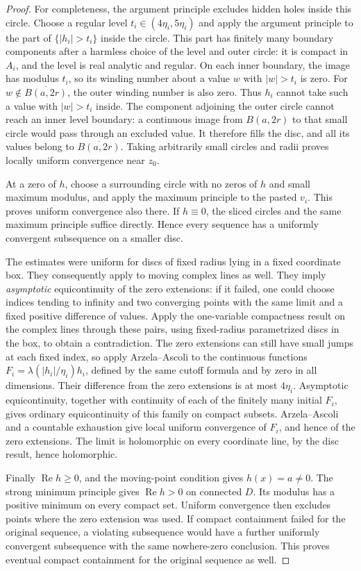 \begin{proof}
For completeness, the argument principle excludes hidden holes
inside this circle. Choose a regular level
\(t_i\in(4\eta_i,5\eta_i)\) and apply the argument principle
to the part of \(\{|h_i|>t_i\}\) inside the circle. This part
has finitely many boundary components after a harmless choice
of the level and outer circle: it is compact in \(A_i\), and
the level is real analytic and regular. On each inner boundary,
the image has modulus \(t_i\), so its winding number about a
value \(w\) with \(|w|>t_i\) is zero. For
\(w\notin\overline{B(a,2r)}\), the outer winding number is
also zero. Thus \(h_i\) cannot take such a value with
\(|w|>t_i\) inside. The component adjoining the outer circle
cannot reach an inner level boundary: a continuous image from
\(B(a,2r)\) to that small circle would pass through an excluded
value. It therefore fills the disc, and all its values belong
to \(\overline{B(a,2r)}\). Taking arbitrarily small circles
and radii proves locally uniform convergence near \(z_0\).

At a zero of \(h\), choose a surrounding circle with no zeros
of \(h\) and small maximum modulus, and apply the maximum
principle to the pasted \(v_i\). This proves uniform convergence
also there. If \(h\equiv0\), the sliced circles and the same
maximum principle suffice directly. Hence every sequence has
a uniformly convergent subsequence on a smaller disc.

The estimates were uniform for discs of fixed radius lying in
a fixed coordinate box. They consequently apply to moving
complex lines as well. They imply \emph{asymptotic}
equicontinuity of the zero extensions: if it failed, one could
choose indices tending to infinity and two converging points
with the same limit and a fixed positive difference of values. Apply the
one-variable compactness result on the complex lines through
these pairs, using fixed-radius parametrized discs in the box,
to obtain a contradiction. The zero extensions can still have
small jumps at each fixed index, so apply Arzela--Ascoli to the
continuous functions \(F_i=\lambda(|h_i|/\eta_i)h_i\), defined
by the same cutoff formula and by zero in all dimensions.
Their difference from the zero extensions is at most
\(4\eta_i\). Asymptotic equicontinuity, together with continuity
of each of the finitely many initial \(F_i\), gives ordinary
equicontinuity of this family on compact subsets. Arzela--Ascoli
and a countable exhaustion give local uniform convergence of
\(F_i\), and hence of the zero extensions. The limit is
holomorphic on every coordinate line, by the disc result,
hence holomorphic.

Finally \(\operatorname{Re}h\geq0\), and the moving-point
condition gives \(h(x)=a\ne0\). The strong minimum principle
gives \(\operatorname{Re}h>0\) on connected \(D\). Its modulus
has a positive minimum on every compact set. Uniform convergence
then excludes points where the zero extension was used.
If compact containment failed for the original sequence, a
violating subsequence would have a further uniformly convergent
subsequence with the same nowhere-zero conclusion. This proves
eventual compact containment for the original sequence as well.
\end{proof}

